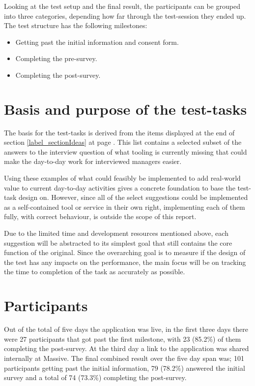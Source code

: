 \documentclass[nofilelist,dvipsnames]{cslthse-msc}
\begin{document}
{    Looking at the test setup and the final result, the participants can be
    grouped into three categories, depending how far through the test-session
    they ended up. The test structure has the following milestones:
    \begin{itemize}
      \item{Getting past the initial information and consent form.}
      \item{Completing the pre-survey.}
      \item{Completing the post-survey.}
    \end{itemize}

    \section{Basis and purpose of the test-tasks}

    The basis for the test-tasks is derived from the items displayed at the
    end of section \ref{label_sectionIdeas} at page \pageref{label_ideas}.
    This list contains a selected subset of the answers to the
    interview question of what tooling is currently missing that could make
    the day-to-day work for interviewed managers easier.

    Using these examples of what could feasibly be implemented to add
    real-world value to current day-to-day activities gives a concrete
    foundation to base the test-task design on. However, since all of
    the select suggestions could be implemented as a self-contained tool or
    service in their own right, implementing each of them fully, with
    correct behaviour, is outside the scope of this report.

    Due to the limited time and development resources mentioned above, each
    suggestion will be abstracted to its simplest goal that still contains
    the core function of the original. Since the overarching goal is to
    measure if the design of the test has any impacts on the performance,
    the main focus will be on tracking the time to completion of the task
    as accurately as possible.


	  \section{Participants}

    Out of the total of five days the application was live, in the first
    three days there were 27 participants that got past the first milestone,
    with 23 (85.2\%) of them completing the post-survey. At the third day a
    link to the application was shared internally at Massive. The final
    combined result over the five day span was; 101 participants getting past
    the initial information, 79 (78.2\%) answered the initial survey and a
    total of 74 (73.3\%) completing the post-survey.

}
\end{document}
